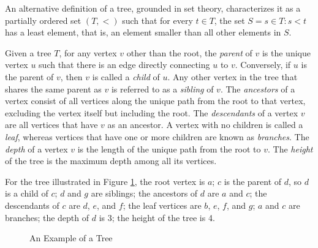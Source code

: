 \begin{example}
An alternative definition of a tree, grounded in set theory, characterizes it as a partially ordered set $(T, <)$ such that for every $t \in T$, the set $S = { s \in T : s < t }$ has a least element, that is, an element smaller than all other elements in $S$.
\end{example}

Given a tree $T$, for any vertex $v$ other than the root, the \emph{parent} of $v$ is the unique vertex $u$ such that there is an edge directly connecting $u$ to $v$. Conversely, if $u$ is the parent of $v$, then $v$ is called a \emph{child} of $u$. Any other vertex in the tree that shares the same parent as $v$ is referred to as a \emph{sibling} of $v$. The \emph{ancestors} of a vertex consist of all vertices along the unique path from the root to that vertex, excluding the vertex itself but including the root. The \emph{descendants} of a vertex $v$ are all vertices that have $v$ as an ancestor. A vertex with no children is called a \emph{leaf}, whereas vertices that have one or more children are known as \emph{branches}. The \emph{depth} of a vertex $v$ is the length of the unique path from the root to $v$. The \emph{height} of the tree is the maximum depth among all its vertices.

\begin{example}
For the tree illustrated in Figure \ref{fig:BinaryTree-Example}, the root vertex is $a$; $c$ is the parent of $d$, so $d$ is a child of $c$; $d$ and $g$ are siblings; the ancestors of $d$ are $a$ and $c$; the descendants of $c$ are $d$, $e$, and $f$; the leaf vertices are $b$, $e$, $f$, and $g$; $a$ and $c$ are branches; the depth of $d$ is 3; the height of the tree is 4.
\end{example}

\begin{figure}[t]
\centering
{}
\caption{\label{fig:BinaryTree-Example}An Example of a Tree}
\end{figure}

